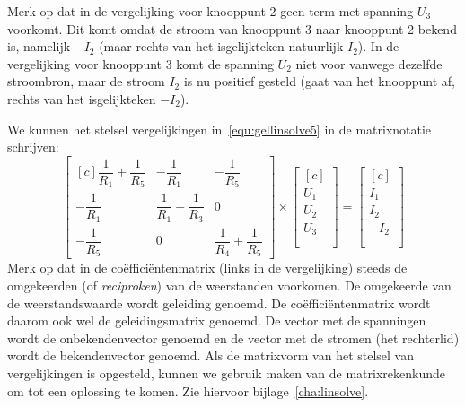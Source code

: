 %
Merk op dat in de vergelijking voor knooppunt 2 geen term met spanning $U_3$ voorkomt. Dit komt omdat de stroom van knooppunt 3 naar knooppunt 2 bekend is, namelijk $-I_2$ (maar rechts van het isgelijkteken natuurlijk $I_2$). In de vergelijking voor knooppunt 3 komt de spanning $U_2$ niet voor vanwege dezelfde stroombron, maar de stroom $I_2$ is nu positief gesteld (gaat van het knooppunt af, rechts van het isgelijkteken $-I_2$).

We kunnen het stelsel vergelijkingen in~\eqref{equ:gellinsolve5} in de matrixnotatie schrijven:
%
\begin{equation}\label{equ:gelmatrixnotatie1}
\begin{bmatrix*}[c]
\dfrac{1}{R_1}+\dfrac{1}{R_5} & -\dfrac{1}{R_1} &  -\dfrac{1}{R_5} \\[1em]
-\dfrac{1}{R_1} & \dfrac{1}{R_1}+\dfrac{1}{R_3} & 0 \\[1em]
-\dfrac{1}{R_5} & 0 & \dfrac{1}{R_4}+\dfrac{1}{R_5}
\end{bmatrix*} \times
\begin{bmatrix*}[c]
\\[-0.3em] U_1 \\[1em] U_2 \\[1em] U_3 \\ \\[-0.3em]
\end{bmatrix*} = 
\begin{bmatrix*}[c]
\\[-0.3em] I_1 \\[1em] I_2\\[1em] -I_2 \\ \\[-0.3em]
\end{bmatrix*}
\end{equation}
%
Merk op dat in de coëfficiëntenmatrix (links in de vergelijking) steeds de omgekeerden (of \textsl{reciproken}) van de weerstanden voorkomen. De omgekeerde van de weerstandswaarde wordt geleiding genoemd. De coëfficiëntenmatrix wordt daarom ook wel de geleidingsmatrix genoemd. De vector met de spanningen wordt de onbekendenvector genoemd en de vector met de stromen (het rechterlid) wordt de bekendenvector genoemd. Als de matrixvorm van het stelsel van vergelijkingen is opgesteld, kunnen we gebruik maken van de matrixrekenkunde om tot een oplossing te komen. Zie hiervoor bijlage~\ref{cha:linsolve}.


